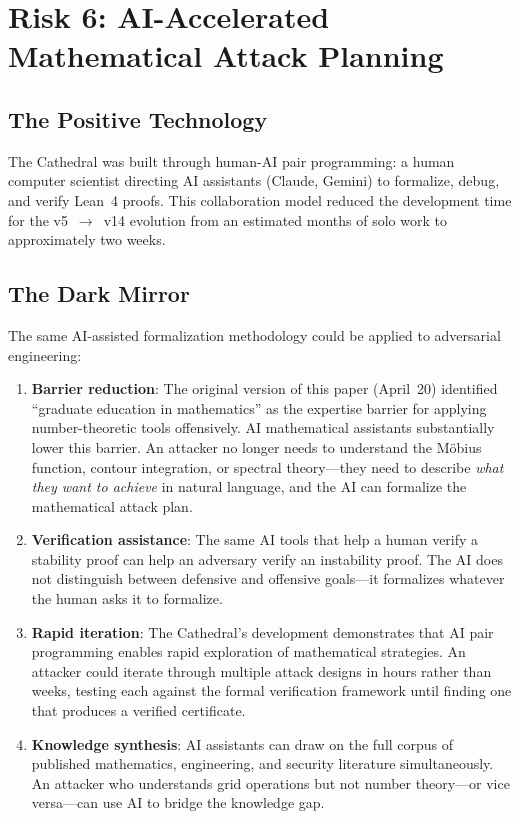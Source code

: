 \documentclass[11pt,a4paper]{article}
\begin{document}
\section{Risk 6: AI-Accelerated Mathematical Attack Planning}
\label{sec:ai}

\subsection{The Positive Technology}

The Cathedral was built through human-AI pair programming: a human
computer scientist directing AI assistants (Claude, Gemini) to formalize,
debug, and verify Lean~4 proofs. This collaboration model reduced the
development time for the v5~$\to$~v14 evolution from an estimated
months of solo work to approximately two weeks.

\subsection{The Dark Mirror}

The same AI-assisted formalization methodology could be applied to
adversarial engineering:

\begin{enumerate}
  \item \textbf{Barrier reduction}: The original version of this paper
    (April~20) identified ``graduate education in mathematics'' as the
    expertise barrier for applying number-theoretic tools offensively.
    AI mathematical assistants substantially lower this barrier. An
    attacker no longer needs to understand the M\"obius function,
    contour integration, or spectral theory---they need to describe
    \emph{what they want to achieve} in natural language, and the AI
    can formalize the mathematical attack plan.

  \item \textbf{Verification assistance}: The same AI tools that
    help a human verify a stability proof can help an adversary verify
    an instability proof. The AI does not distinguish between
    defensive and offensive goals---it formalizes whatever the human
    asks it to formalize.

  \item \textbf{Rapid iteration}: The Cathedral's development
    demonstrates that AI pair programming enables rapid exploration of
    mathematical strategies. An attacker could iterate through
    multiple attack designs in hours rather than weeks, testing each
    against the formal verification framework until finding one that
    produces a verified certificate.

  \item \textbf{Knowledge synthesis}: AI assistants can draw on the
    full corpus of published mathematics, engineering, and security
    literature simultaneously. An attacker who understands grid
    operations but not number theory---or vice versa---can use AI to
    bridge the knowledge gap.
\end{enumerate}
\end{document}
